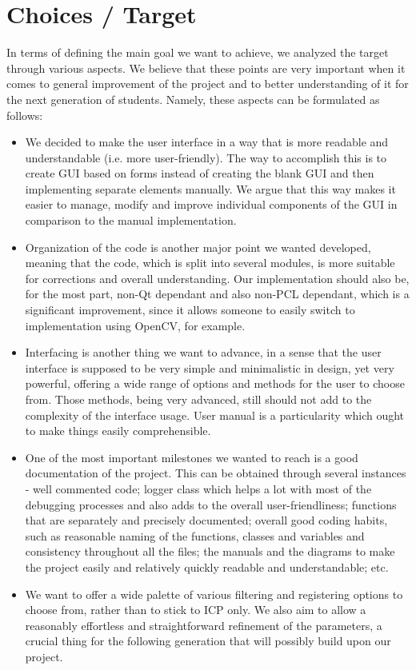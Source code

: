 \documentclass[aps,letterpaper,11pt]{revtex4}
\begin{document}
\section{Choices / Target}
In terms of defining the main goal we want to achieve, we analyzed the target through various aspects. We believe that these points are very important when it comes to general improvement of the project and to better understanding of it for the next generation of students. Namely, these aspects can be formulated as follows:
\begin{itemize}
  \item We decided to make the user interface in a way that is more readable and understandable (i.e. more user-friendly). The way to accomplish this is to create GUI based on forms instead of creating the blank GUI and then implementing separate elements manually. We argue that this way makes it easier to manage, modify and improve individual components of the GUI in comparison to the manual implementation.
  \item Organization of the code is another major point we wanted developed, meaning that the code, which is split into several modules, is more suitable for corrections and overall understanding. Our implementation should also be, for the most part, non-Qt dependant and also non-PCL dependant, which is a significant improvement, since it allows someone to easily switch to implementation using OpenCV, for example.
  \item Interfacing is another thing we want to advance, in a sense that the user interface is supposed to be very simple and minimalistic in design, yet very powerful, offering a wide range of options and methods for the user to choose from. Those methods, being very advanced, still should not add to the complexity of the interface usage. User manual is a particularity which ought to make things easily comprehensible.
  \item One of the most important milestones we wanted to reach is a good documentation of the project. This can be obtained through several instances - well commented code; logger class which helps a lot with most of the debugging processes and also adds to the overall user-friendliness; functions that are separately and precisely documented; overall good coding habits, such as reasonable naming of the functions, classes and variables and consistency throughout all the files; the manuals and the diagrams to make the project easily and relatively quickly readable and understandable; etc. 
  \item We want to offer a wide palette of various filtering and registering options to choose from, rather than to stick to ICP only. We also aim to allow a reasonably effortless and straightforward refinement of the parameters, a crucial thing for the following generation that will possibly build upon our project.

\end{itemize}
\end{document}
